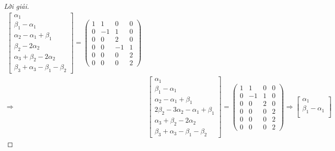 \documentclass[class=linear-algebra,crop=false]{standalone}
\begin{document}
\begin{proof}[Lời giải]
\begin{align*}
\begin{bmatrix}
            \alpha_{1}                           \\
            \beta_{1} - \alpha_{1}               \\
            \alpha_{2} - \alpha_{1} + \beta_{1}  \\
            \beta_{2} - 2\alpha_{2}              \\
            \alpha_{3} + \beta_{2} - 2\alpha_{2} \\
            \beta_{3} + \alpha_{3} - \beta_{1} - \beta_{2}
        \end{bmatrix}=
        \begin{pmatrix}
            1 & 1  & 0  & 0 \\
            0 & -1 & 1  & 0 \\
            0 & 0  & 2  & 0 \\
            0 & 0  & -1 & 1 \\
            0 & 0  & 0  & 2 \\
            0 & 0  & 0  & 2
        \end{pmatrix}                  \\
        \Longrightarrow &
        \begin{bmatrix}
            \alpha_{1}                                        \\
            \beta_{1} - \alpha_{1}                            \\
            \alpha_{2} - \alpha_{1} + \beta_{1}               \\
            2\beta_{2} - 3\alpha_{2} - \alpha_{1} + \beta_{1} \\
            \alpha_{3} + \beta_{2} - 2\alpha_{2}              \\
            \beta_{3} + \alpha_{3} - \beta_{1} - \beta_{2}
        \end{bmatrix}=
        \begin{pmatrix}
            1 & 1  & 0 & 0 \\
            0 & -1 & 1 & 0 \\
            0 & 0  & 2 & 0 \\
            0 & 0  & 0 & 2 \\
            0 & 0  & 0 & 2 \\
            0 & 0  & 0 & 2
        \end{pmatrix}
        \Longrightarrow
        \begin{bmatrix}
            \alpha_{1}                                                   \\
            \beta_{1} - \alpha_{1}                                       \\

\end{bmatrix}
\end{align*}
\end{proof}
\end{document}
